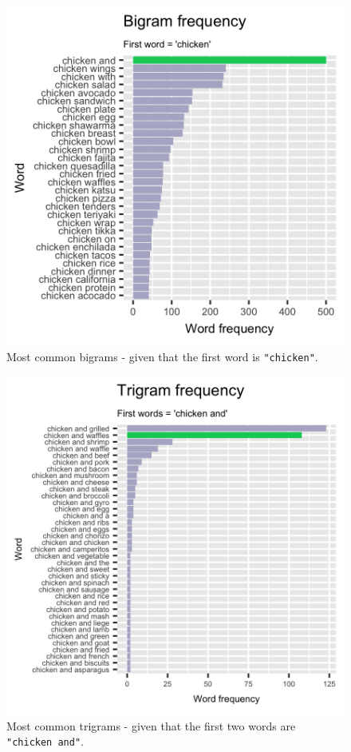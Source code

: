 \documentclass[letterpaper, 10 pt, conference]{ieeeconf}
\begin{document}
\begin{figure}[H]
\centering
\includegraphics[width=.8\linewidth]{first_bigram}
\caption{Most common bigrams - given that the first word is \texttt{"chicken"}.}
\label{fig:test1}
\end{figure}
\begin{figure}[H]
\centering
\includegraphics[width=.8\linewidth]{first_tri}
\caption{Most common trigrams - given that the first two words are \texttt{"chicken and"}.}
\label{fig:test1}
\end{figure}

\newpage
\end{document}
